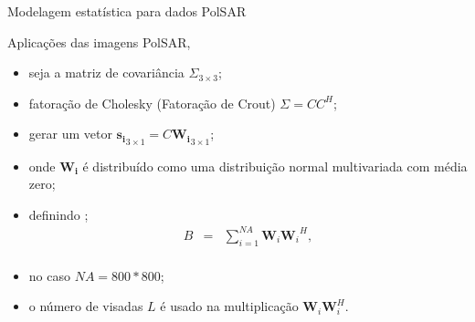 \documentclass[10pt]{beamer}
\begin{document}
\begin{frame}[fragile]{Modelagem estatística para dados PolSAR}
\begin{alertblock}{Aplicações das imagens PolSAR, \cite{of}}
  \begin{itemize}
\item seja a matriz de covariância $\Sigma_{3\times 3}$;
\item fatoração de Cholesky (Fatoração de Crout) $\Sigma= CC^{H}$;
\item gerar um vetor $\mathbf{s_i}_{3\times 1}= C\mathbf{W_i}_{3\times 1}$;
\item onde $\mathbf{W_i}$ é distribuído como uma distribuição normal multivariada com média zero;
\item definindo ;
\begin{equation}
\begin{array}{ccc}
    B&=&\displaystyle{\sum_{i=1}^{NA} {\mathbf{W}_i}{\mathbf{W}_i}^H}, \\
\end{array}
\end{equation}
\item no caso $NA=800*800$;
\item o número de visadas $L$ é usado na multiplicação $\mathbf{W}_i\mathbf{W}_i^H$.
\end{itemize}
\end{alertblock}
\end{frame}
\end{document}

